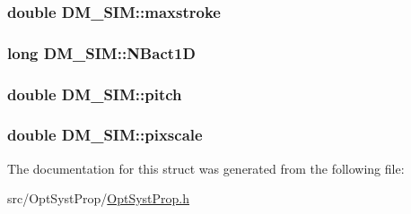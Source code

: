 \hypertarget{structDM__SIM_abecbaa72dee8fc92256ae7368e4f48fb}{
\subsubsection[{maxstroke}]{\setlength{\rightskip}{0pt plus 5cm}double D\+M\+\_\+\+S\+I\+M\+::maxstroke}}\label{structDM__SIM_abecbaa72dee8fc92256ae7368e4f48fb}
\hypertarget{structDM__SIM_a2ce1ee098755e4e7996951cd71d8976b}{
\subsubsection[{N\+Bact1\+D}]{\setlength{\rightskip}{0pt plus 5cm}long D\+M\+\_\+\+S\+I\+M\+::\+N\+Bact1\+D}}\label{structDM__SIM_a2ce1ee098755e4e7996951cd71d8976b}
\hypertarget{structDM__SIM_ade1c585e1ec4dff6446ba9e8349082d0}{
\subsubsection[{pitch}]{\setlength{\rightskip}{0pt plus 5cm}double D\+M\+\_\+\+S\+I\+M\+::pitch}}\label{structDM__SIM_ade1c585e1ec4dff6446ba9e8349082d0}
\hypertarget{structDM__SIM_a88f9258d3a795e433186d8ae4b77a418}{
\subsubsection[{pixscale}]{\setlength{\rightskip}{0pt plus 5cm}double D\+M\+\_\+\+S\+I\+M\+::pixscale}}\label{structDM__SIM_a88f9258d3a795e433186d8ae4b77a418}


The documentation for this struct was generated from the following file\+:\begin{DoxyCompactItemize}
\item 
src/\+Opt\+Syst\+Prop/\hyperlink{OptSystProp_8h}{Opt\+Syst\+Prop.\+h}\end{DoxyCompactItemize}
